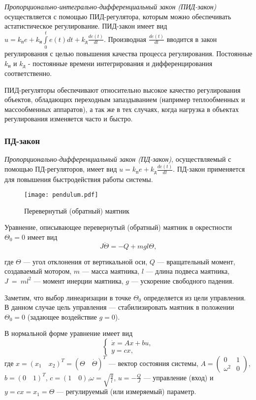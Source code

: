 \documentclass[../../TAU.tex]{subfiles}
\begin{document}
    {\it Пропорционально-интегрально-дифференциальный закон (ПИД-закон)} осуществляется с помощью ПИД-регулятора, которым можно обеспечивать астатистическое регулирование. ПИД-закон имеет вид $u=k_\text{п}e+ k_\text{и}\int\limits_0^t e(t) dt +k_\text{д} \frac{de(t)}{dt}$. Производная $\frac{d e(t)}{dt}$ вводится в закон регулирования с целью повышения качества процесса регулирования. Постоянные $k_\text{и}$ и $k_\text{д}$ - постоянные времени интегрирования и дифференцирования соответственно.
    
    ПИД-регуляторы обеспечивают относительно высокое качество регулирования объектов, обладающих переходным запаздыванием (например теплообменных и массообменных аппаратов), а так же в тех случаях, когда нагрузка в объектах регулирования изменяется часто и быстро.


\subsubsection{ПД-закон}

    {\it Пропорционально-дифференциальный закон (ПД-закон)}, осуществляемый с помощью ПД-регуляторов, имеет вид $u=k_\text{п}e+ k_\text{д} \frac{de(t)}{dt}$. ПД-закон применяется для повышения быстродействия работы системы.

    \begin{figure}[h]
    \centering
    \texttt{[image: pendulum.pdf]}
    \caption{Перевернутый (обратный) маятник}
    \centering
    \end{figure}

    Уравнение, описывающее перевернутый (обратный) маятник в окрестности $\Theta_0=0$ имеет вид
    \begin{equation}\label{EQ1_1}
    J\ddot\Theta = -Q+mgl\Theta,
    \end{equation}
    {\small где $\Theta$ --- угол отклонения от вертикальной оси, $Q$ --- вращательный момент, создаваемый мотором, $m$ --- масса маятника, $l$ --- длина подвеса
    маятника, $J~=~ml^2$ --- момент инерции маятника, $g$ --- ускорение свободного падения.

    Заметим, что выбор линеаризации в точке $\Theta_0$ определяется из цели управления. В данном случае цель управления --- стабилизировать маятник в положении $\Theta_0 = 0$ (задающее воздействие $g = 0$).
    }

    В нормальной форме уравнение  имеет вид
    \begin{equation}\label{EQ1_1NORM}
    \begin{cases}
    \dot x = Ax + bu,\\
    y = c x,
    \end{cases}
    \end{equation}
    где $x = (x_1\quad x_2)^T = ( \Theta\quad \dot\Theta)^T$ --- вектор состояния системы, $A =\begin{pmatrix}0 & 1\\ \omega^2& 0\end{pmatrix}$,$b = (0\quad 1)^T$, $c = (1\quad0)$,$\omega = \sqrt{\frac{g}{l}}$, $u = -\frac{Q}{J}$ --- управление (вход) и $y = cx = x_1 = \Theta$ --- регулируемый (или измеряемый) параметр.
\end{document}
